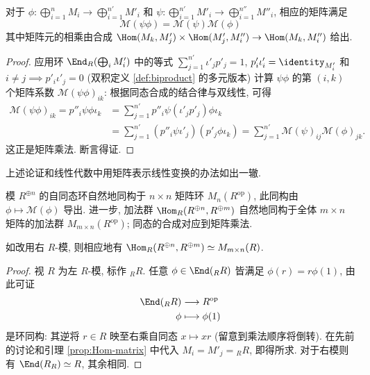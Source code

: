 \begin{lemma}\label{prop:Hom-matrix}
	对于 $\phi: \bigoplus_{i=1}^n M_i \to \bigoplus_{i=1}^{n'} M'_i$ 和 $\psi: \bigoplus_{i=1}^{n'} M'_i \to \bigoplus_{i=1}^{n''} M''_i$, 相应的矩阵满足
	\[ \mathcal{M}(\psi\phi) = \mathcal{M}(\psi) \mathcal{M}(\phi) \]
	其中矩阵元的相乘由合成 $\Hom(M_k, M'_j) \times \Hom(M'_j, M''_i) \to \Hom(M_k, M''_i)$ 给出.
\end{lemma}
\begin{proof}
	应用环 $\End_R(\bigoplus_i M'_i)$ 中的等式 $\sum_{j=1}^{n'} \iota'_j p'_j = 1$, $p'_i \iota'_i = \identity_{M'_i}$ 和 $i \neq j \implies p'_i \iota'_j = 0$ (双积定义 \ref{def:biproduct} 的多元版本) 计算 $\psi\phi$ 的第 $(i, k)$ 个矩阵系数 $\mathcal{M}(\psi\phi)_{ik}$: 根据同态合成的结合律与双线性, 可得
	\begin{align*}
		\mathcal{M}(\psi\phi)_{ik} = p''_i \psi\phi \iota_k & = \sum_{j=1}^{n'} p''_i \psi (\iota'_j p'_j) \phi \iota_k \\
		& = \sum_{j=1}^{n'} (p''_i \psi \iota'_j) (p'_j \phi \iota_k) = \sum_{j=1}^{n'} \mathcal{M}(\psi)_{ij} \mathcal{M}(\phi)_{jk}.
	\end{align*}
	这正是矩阵乘法. 断言得证.
\end{proof}

上述论证和线性代数中用矩阵表示线性变换的办法如出一辙.
\begin{proposition}\label{prop:End-matrix}
	模 $R^{\oplus n}$ 的自同态环自然地同构于 $n \times n$ 矩阵环 $M_n(R^\text{op})$, 此同构由 $\phi \mapsto \mathcal{M}(\phi)$ 导出. 进一步, 加法群 $\Hom_R(R^{\oplus n}, R^{\oplus m})$ 自然地同构于全体 $m \times n$ 矩阵的加法群 $M_{m \times n}(R^\text{op})$; 同态的合成对应到矩阵乘法.
	
	如改用右 $R$-模, 则相应地有 $\Hom_R(R^{\oplus n}, R^{\oplus m}) \simeq M_{m \times n}(R)$.
\end{proposition}
\begin{proof}
	视 $R$ 为左 $R$-模, 标作 ${}_R R$. 任意 $\phi \in \End({}_R R)$ 皆满足 $\phi(r) = r\phi(1)$, 由此可证
	\begin{align*}
		\End({}_R R) & \longrightarrow R^\text{op} \\
		\phi & \longmapsto \phi(1)
	\end{align*}
	是环同构: 其逆将 $r \in R$ 映至右乘自同态 $x \mapsto xr$ (留意到乘法顺序将倒转). 在先前的讨论和引理 \ref{prop:Hom-matrix} 中代入 $M_i = M'_j = {}_R R$, 即得所求. 对于右模则有 $\End(R_R) \simeq R$, 其余相同.
\end{proof}

